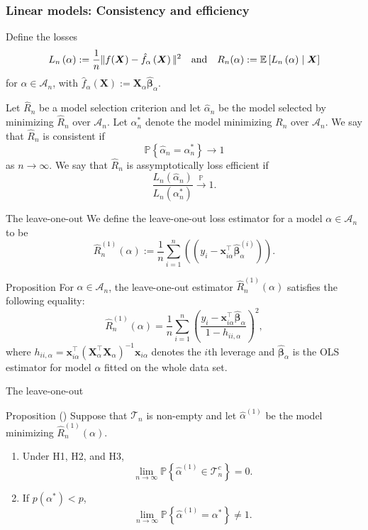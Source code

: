 \documentclass{beamer}
\newcommand{\0}{\emptyset}
\newcommand{\prob}{\mathbb{P}}
\newcommand{\Ep}[1]{\mathbb{E}\left[ #1 \right]}
\newcommand{\paren}[1]{\left(#1 \right)}
\newcommand{\set}[1]{\left\{ #1 \right\}}
\newcommand{\norm}[1]{|\hspace{-1pt}|#1 |\hspace{-1pt}|}
\newcommand{\normsq}[1]{\norm{#1}^{2}}
\newcommand{\Acal}{\mathcal{A}_{n}}
\newcommand{\Tcal}{\mathcal{T}_{n}}
\newcommand{\X}{\boldsymbol{X}}
\newcommand{\x}{\boldsymbol{x}}
\newcommand{\bbetahat}{\boldsymbol{\hat{\beta}}}
\newcommand{\Loss}[1]{L_{n}\paren{#1}}
\newcommand{\alphahat}[1]{\hat{\alpha}^{#1}}
\newcommand{\loocv}[1]{\hat{R}^{(1)}_{n}\paren{#1}}
\newcommand{\1}{\mathmybb{1}}
\begin{document}
\begin{frame}
    \frametitle{Linear models: Consistency and efficiency}
    Define the losses
    \[\Loss{\alpha}:=\frac{1}{n}\normsq{f(\X) - \hat{f}_{\alpha}\paren{\X}}\quad\text{and}\quad R_{n}(\alpha):= \Ep{\Loss{\alpha}\mid\X}\]
    for \(\alpha\in\Acal\), with \(\hat{f}_{\alpha}(\X):=\X_{\alpha}\bbetahat_{\alpha}\).

    Let \(\hat{R}_{n}\) be a model selection criterion and let \(\alphahat{}_{n}\) be the model selected by minimizing \(\hat{R}_{n}\) over \(\Acal\). Let \(\alpha^{*}_{n}\) denote the model minimizing \(R_{n}\) over \(\Acal\). We say that \(\hat{R}_{n}\) is \alert{consistent} if 
    \[\prob\set{\alphahat{}_{n} = \alpha^{*}_{n}}\to 1\]
    as \(n\to\infty\). We say that \(\hat{R}_{n}\) is \alert{assymptotically loss efficient} if 
    \[\frac{L_{n}(\alphahat{}_{n})}{L_{n}(\alpha^{*}_{n})}\xrightarrow{\prob} 1.\]
  
\end{frame}

\begin{frame}{The leave-one-out}
    We define the leave-one-out loss estimator for a model \(\alpha\in\Acal\) to be 
    \[\loocv{\alpha} := \frac{1}{n}\sum_{i=1}^{n}\paren{(y_{i} - \x_{i\alpha}^{\top}\bbetahat_{\alpha}^{(i)})}.\]

    \begin{block}{Proposition}
        For \(\alpha\in\Acal\), the leave-one-out estimator \(\loocv{\alpha}\) satisfies the following equality:
        \[\loocv{\alpha}= \frac{1}{n}\sum_{i=1}^{n}\paren{\frac{y_{i}-\x_{i\alpha}^{\top}\bbetahat_{\alpha}}{1-h_{ii,\alpha}}}^{2},\]
        where \(h_{ii,\alpha} = \x_{i\alpha}^{\top}{(\X_{\alpha}^{\top}\X_{\alpha})}^{-1}\x_{i\alpha}\) denotes the \(i\)th leverage and \(\bbetahat_{\alpha}\) is the OLS estimator for model \(\alpha\) fitted on the whole data set.
    \end{block}
\end{frame}

\begin{frame}{The leave-one-out}
    \begin{block}{Proposition (\cite{shao_1993})}
        Suppose that \(\Tcal\) is non-empty and let \(\alphahat{(1)}\) be the model minimizing \(\loocv{\alpha}\).
            \begin{enumerate}
                \item Under H1, H2, and H3, \[\lim_{n\to\infty}\prob\set{\alphahat{(1)}\in\Tcal^{c}}=0.\]
                \item If \(p(\alpha^*) < p\), \[\lim_{n\to\infty}\prob\set{\alphahat{(1)}=\alpha^{*}}\neq 1.\]
            \end{enumerate}
    \end{block}
\end{frame}
\end{document}
